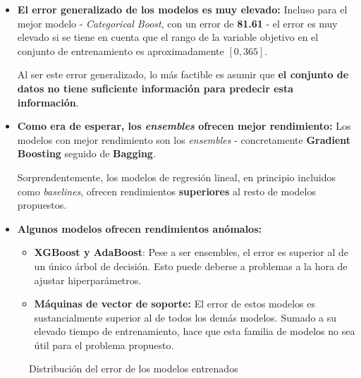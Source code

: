 \begin{itemize}[leftmargin=*, parsep=1pt, itemsep=2pt, topsep=1pt]
	\item \textbf{El error generalizado de los modelos es muy elevado:} Incluso para el mejor modelo - \textit{Categorical Boost}, con un error de \textbf{81.61} - el error es muy elevado si se tiene en cuenta que el rango de la variable objetivo en el conjunto de entrenamiento es aproximadamente $[0, 365]$.
	
	Al ser este error generalizado, lo más factible es asumir que \textbf{el conjunto de datos no tiene suficiente información para predecir esta información}.
	\item \textbf{Como era de esperar, los \textit{ensembles} ofrecen mejor rendimiento:} Los modelos con mejor rendimiento son los \textit{ensembles} - concretamente \textbf{Gradient Boosting} seguido de \textbf{Bagging}.
	
	Sorprendentemente, los modelos de regresión lineal, en principio incluidos como \textit{baselines}, ofrecen rendimientos \textbf{superiores} al resto de modelos propuestos.
	\item \textbf{Algunos modelos ofrecen rendimientos anómalos:}
	\begin{itemize}
		\item \textbf{XGBoost y AdaBoost}: Pese a ser ensembles, el error es superior al de un único árbol de decisión. Esto puede deberse a problemas a la hora de ajustar hiperparámetros.
		\item \textbf{Máquinas de vector de soporte:} El error de estos modelos es sustancialmente superior al de todos los demás modelos. Sumado a su elevado tiempo de entrenamiento, hace que esta familia de modelos no sea útil para el problema propuesto.
	\end{itemize}
\end{itemize}

\begin{figure}[h]
	\vspace{-6mm}
	\centering
	\captionsetup{belowskip=-5pt, justification=centering}
	\caption{Distribución del error de los modelos entrenados}
	\label{fig:ch5valerror}
\end{figure}

